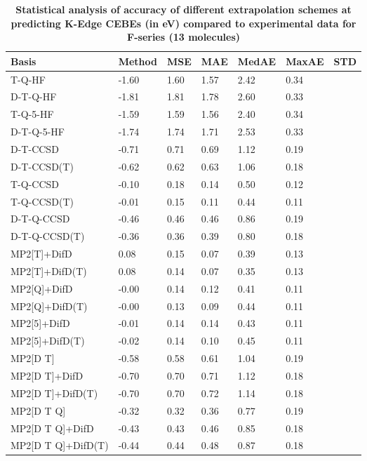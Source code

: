 \begin{table}
  \caption{\textbf{Statistical analysis of accuracy of different extrapolation schemes at predicting K-Edge CEBEs (in eV) compared to experimental data for F-series (13 molecules)}}
  \label{tbl:extrap-scheme-summary-f}
  \begin{tabular}{l l l l l l l }
    \hline
    \textbf{Basis} & \textbf{Method} & \textbf{MSE} & \textbf{MAE} & \textbf{MedAE} & \textbf{MaxAE} & \textbf{STD} \\ 
    \hline
    T-Q-HF & -1.60 & 1.60 & 1.57 & 2.42 & 0.34 \\ 
    D-T-Q-HF & -1.81 & 1.81 & 1.78 & 2.60 & 0.33 \\ 
    T-Q-5-HF & -1.59 & 1.59 & 1.56 & 2.40 & 0.34 \\ 
    D-T-Q-5-HF & -1.74 & 1.74 & 1.71 & 2.53 & 0.33 \\ 
    D-T-CCSD & -0.71 & 0.71 & 0.69 & 1.12 & 0.19 \\ 
    D-T-CCSD(T) & -0.62 & 0.62 & 0.63 & 1.06 & 0.18 \\ 
    T-Q-CCSD & -0.10 & 0.18 & 0.14 & 0.50 & 0.12 \\ 
    T-Q-CCSD(T) & -0.01 & 0.15 & 0.11 & 0.44 & 0.11 \\ 
    D-T-Q-CCSD & -0.46 & 0.46 & 0.46 & 0.86 & 0.19 \\ 
    D-T-Q-CCSD(T) & -0.36 & 0.36 & 0.39 & 0.80 & 0.18 \\ 
    MP2[T]+DifD & 0.08 & 0.15 & 0.07 & 0.39 & 0.13 \\ 
    MP2[T]+DifD(T) & 0.08 & 0.14 & 0.07 & 0.35 & 0.13 \\ 
    MP2[Q]+DifD & -0.00 & 0.14 & 0.12 & 0.41 & 0.11 \\ 
    MP2[Q]+DifD(T) & -0.00 & 0.13 & 0.09 & 0.44 & 0.11 \\ 
    MP2[5]+DifD & -0.01 & 0.14 & 0.14 & 0.43 & 0.11 \\ 
    MP2[5]+DifD(T) & -0.02 & 0.14 & 0.10 & 0.45 & 0.11 \\ 
    MP2[D T] & -0.58 & 0.58 & 0.61 & 1.04 & 0.19 \\ 
    MP2[D T]+DifD & -0.70 & 0.70 & 0.71 & 1.12 & 0.18 \\ 
    MP2[D T]+DifD(T) & -0.70 & 0.70 & 0.72 & 1.14 & 0.18 \\ 
    MP2[D T Q] & -0.32 & 0.32 & 0.36 & 0.77 & 0.19 \\ 
    MP2[D T Q]+DifD & -0.43 & 0.43 & 0.46 & 0.85 & 0.18 \\ 
    MP2[D T Q]+DifD(T) & -0.44 & 0.44 & 0.48 & 0.87 & 0.18 \\ 

\end{tabular}
\end{table}
